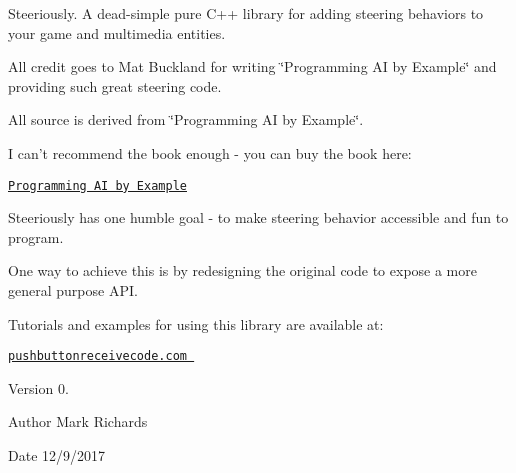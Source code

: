 Steeriously. A dead-\/simple pure C++ library for adding steering behaviors to your game and multimedia entities. \par
All credit goes to Mat Buckland for writing \char`\"{}\-Programming A\-I by Example\char`\"{} and providing such great steering code. \par
All source is derived from \char`\"{}\-Programming A\-I by Example\char`\"{}.\par
 \par
I can't recommend the book enough -\/ you can buy the book here\-: \par
\href{http://www.amazon.com/Programming-Example-Wordware-Developers-Library/dp/1556220782/ref=sr_1_1?ie=UTF8&qid=1446057032&sr=8-1&keywords=programming+ai+by+example}{\tt Programming A\-I by Example} \par
 \par
Steeriously has one humble goal -\/ to make steering behavior accessible and fun to program. \par
One way to achieve this is by redesigning the original code to expose a more general purpose A\-P\-I. \par
 \par
Tutorials and examples for using this library are available at\-: \par
 \par
\href{http://pushbuttonreceivecode.com}{\tt pushbuttonreceivecode.\-com }\begin{DoxyVersion}{Version}
0. 
\end{DoxyVersion}
\begin{DoxyAuthor}{Author}
Mark Richards 
\end{DoxyAuthor}
\begin{DoxyDate}{Date}
12/9/2017 \par
 
\end{DoxyDate}
